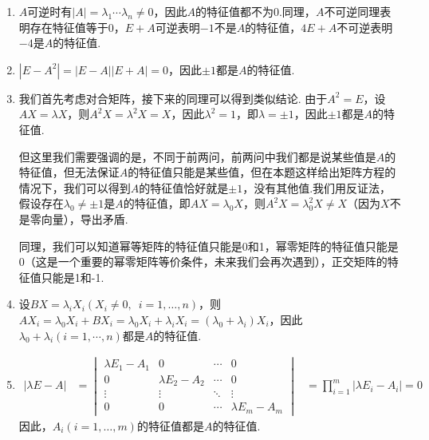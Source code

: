 \begin{solution}
    \begin{enumerate}
        \item $A$可逆时有$|A|=\lambda_1\cdots\lambda_n\neq 0$，因此$A$的特征值都不为0.同理，$A$不可逆同理表明存在特征值等于0，$E+A$可逆表明$-1$不是$A$的特征值，$4E+A$不可逆表明$-4$是$A$的特征值.

        \item $|E-A^2|=|E-A||E+A|=0$，因此$\pm 1$都是$A$的特征值.

        \item 我们首先考虑对合矩阵，接下来的同理可以得到类似结论. 由于$A^2=E$，设$AX=\lambda X$，则$A^2X=\lambda^2X=X$，因此$\lambda^2=1$，即$\lambda=\pm 1$，因此$\pm 1$都是$A$的特征值.

        但这里我们需要强调的是，不同于前两问，前两问中我们都是说某些值是$A$的特征值，但无法保证$A$的特征值只能是某些值，但在本题这样给出矩阵方程的情况下，我们可以得到$A$的特征值恰好就是$\pm 1$，没有其他值.我们用反证法，假设存在$\lambda_0\neq\pm 1$是$A$的特征值，即$AX=\lambda_0X$，则$A^2X=\lambda_0^2X\neq X$（因为$X$不是零向量），导出矛盾.

        同理，我们可以知道幂等矩阵的特征值只能是0和1，幂零矩阵的特征值只能是0（这是一个重要的幂零矩阵等价条件，未来我们会再次遇到），正交矩阵的特征值只能是1和-1.

        \item 设$BX=\lambda_iX_i(X_i\neq 0,\enspace i=1,\ldots,n)$，则$AX_i=\lambda_0X_i+BX_i=\lambda_0X_i+\lambda_iX_i=(\lambda_0+\lambda_i)X_i$，因此$\lambda_0+\lambda_i(i=1,\cdots,n)$都是$A$的特征值.

        \item \begin{align*}
            |\lambda E-A|&=\begin{vmatrix}
                \lambda E_1-A_1 & 0 & \cdots & 0 \\
                0 & \lambda E_2-A_2 & \cdots & 0 \\
                \vdots & \vdots & \ddots & \vdots \\
                0 & 0 & \cdots & \lambda E_m-A_m
            \end{vmatrix}
            &=\prod_{i=1}^{m}|\lambda E_i-A_i|=0
        \end{align*}
        因此，$A_i(i=1,\ldots,m)$的特征值都是$A$的特征值.
    \end{enumerate}
\end{solution}

